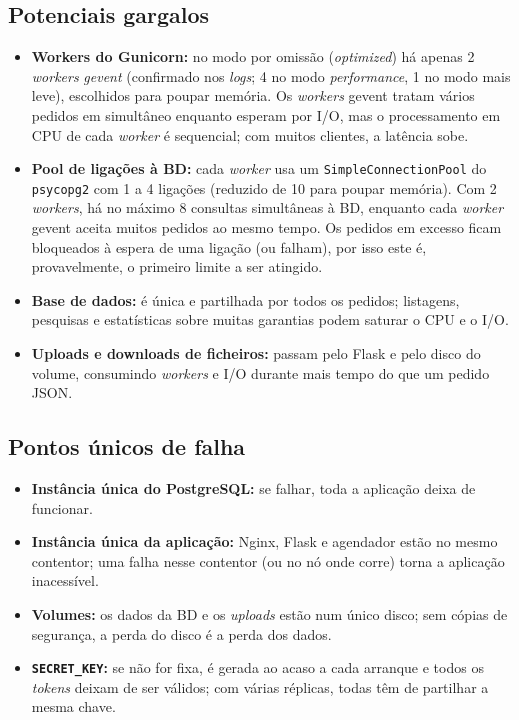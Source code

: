 \documentclass[11pt,a4paper]{article}
\newcommand{\code}[1]{\texttt{#1}}
\begin{document}
\subsection{Potenciais gargalos}
\begin{itemize}
  \item \textbf{Workers do Gunicorn:} no modo por omissão (\emph{optimized}) há apenas 2 \emph{workers}
  \emph{gevent} (confirmado nos \emph{logs}; 4 no modo \emph{performance}, 1 no modo mais leve),
  escolhidos para poupar memória. Os \emph{workers} gevent tratam vários pedidos em simultâneo
  enquanto esperam por I/O, mas o processamento em CPU de cada \emph{worker} é sequencial; com muitos
  clientes, a latência sobe.
  \item \textbf{Pool de ligações à BD:} cada \emph{worker} usa um \code{SimpleConnectionPool} do
  \code{psycopg2} com 1 a 4 ligações (reduzido de 10 para poupar memória). Com 2 \emph{workers}, há no
  máximo 8 consultas simultâneas à BD, enquanto cada \emph{worker} gevent aceita muitos pedidos ao mesmo
  tempo. Os pedidos em excesso ficam bloqueados à espera de uma ligação (ou falham), por isso este é,
  provavelmente, o primeiro limite a ser atingido.
  \item \textbf{Base de dados:} é única e partilhada por todos os pedidos; listagens, pesquisas e
  estatísticas sobre muitas garantias podem saturar o CPU e o I/O.
  \item \textbf{Uploads e downloads de ficheiros:} passam pelo Flask e pelo disco do volume, consumindo
  \emph{workers} e I/O durante mais tempo do que um pedido JSON.
\end{itemize}

\subsection{Pontos únicos de falha}
\begin{itemize}
  \item \textbf{Instância única do PostgreSQL:} se falhar, toda a aplicação deixa de funcionar.
  \item \textbf{Instância única da aplicação:} Nginx, Flask e agendador estão no mesmo contentor; uma
  falha nesse contentor (ou no nó onde corre) torna a aplicação inacessível.
  \item \textbf{Volumes:} os dados da BD e os \emph{uploads} estão num único disco; sem cópias de
  segurança, a perda do disco é a perda dos dados.
  \item \textbf{\code{SECRET\_KEY}:} se não for fixa, é gerada ao acaso a cada arranque e todos os
  \emph{tokens} deixam de ser válidos; com várias réplicas, todas têm de partilhar a mesma chave.
\end{itemize}
\end{document}
